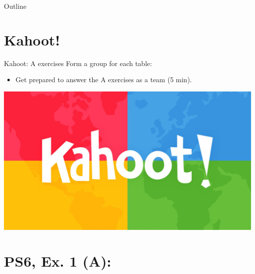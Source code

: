 

\maketitle

\begin{frame}{Outline}
    \tableofcontents
\end{frame}



\section{Kahoot!}

\begin{frame}{Kahoot: A exercises}
  Form a group for each table:
  \begin{itemize}
    \item Get prepared to answer the A exercises as a team (5 min).
  \end{itemize}
  \includegraphics[width=\textwidth]{figures/kahoot}
\end{frame}



\section{PS6, Ex. 1 (A): }

